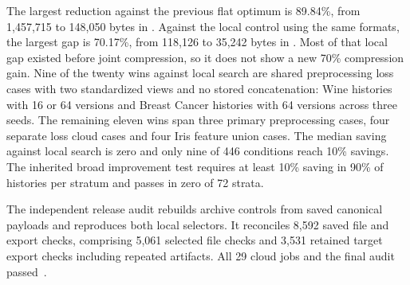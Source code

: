 The largest reduction against the previous flat optimum is 89.84\%, from 1,457,715 to 148,050 bytes in . Against the local control using the same formats, the largest gap is 70.17\%, from 118,126 to 35,242 bytes in . Most of that local gap existed before joint compression, so it does not show a new 70\% compression gain. Nine of the twenty wins against local search are shared preprocessing loss cases with two standardized views and no stored concatenation: Wine histories with 16 or 64 versions and Breast Cancer histories with 64 versions across three seeds. The remaining eleven wins span three primary preprocessing cases, four separate loss cloud cases and four Iris feature union cases. The median saving against local search is zero and only nine of 446 conditions reach 10\% savings. The inherited broad improvement test requires at least 10\% saving in 90\% of histories per stratum and passes in zero of 72 strata.

The independent release audit rebuilds archive controls from saved canonical payloads and reproduces both local selectors. It reconciles 8,592 saved file and export checks, comprising 5,061 selected file checks and 3,531 retained target export checks including repeated artifacts. All 29 cloud jobs and the final audit passed~\cite{artifact}.



